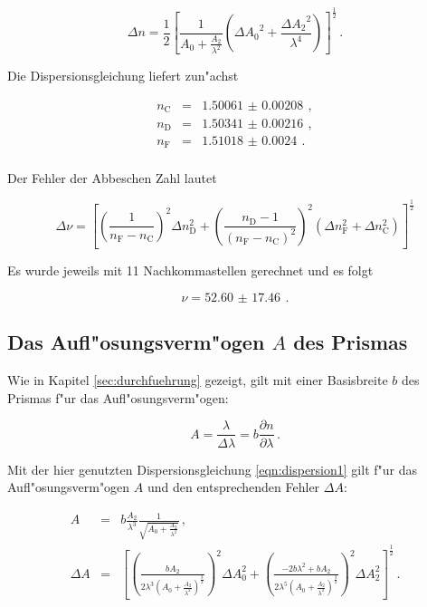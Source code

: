 		\begin{equation*}
			\Delta n = \frac{1}{2}\left[\frac{1}{A_0 + \frac{A_2}{\lambda^2}}\left(\Delta {A_0}^2 + \frac{\Delta {A_2}^2}{\lambda^4}\right)\right]^\frac{1}{2}\,.
		\end{equation*}

		Die Dispersionsgleichung liefert zun"achst

		\begin{eqnarray*}
			n_\mathrm{C} & = & \SI{1.50061(208)}{} \,, \\
			n_\mathrm{D} & = & \SI{1.50341(216)}{} \,, \\
			n_\mathrm{F} & = & \SI{1.51018(240)}{} \,. \\
		\end{eqnarray*}

		Der Fehler der Abbeschen Zahl lautet

		\begin{equation*}
			\Delta \nu = \left[\left(\frac{1}{n_\mathrm{F}-n_\mathrm{C}}\right)^2 \Delta n_\mathrm{D}^2 + \left(\frac{n_\mathrm{D}-1}{(n_\mathrm{F}-n_\mathrm{C})^2}\right)^2\left(\Delta n_\mathrm{F}^2 + \Delta n_\mathrm{C}^2\right) \right]^\frac{1}{2}
		\end{equation*}

		Es wurde jeweils mit 11 Nachkommastellen gerechnet und es folgt

		\begin{equation*}
			\nu = \SI{52.60(1746)}{} \,.
		\end{equation*}

	\subsection{Das Aufl"osungsverm"ogen $A$ des Prismas}
	\label{subsec:aufloesungsvermoegen}
		Wie in Kapitel \ref{sec:durchfuehrung} gezeigt, gilt mit einer Basisbreite $b$ des Prismas f"ur das Aufl"osungsverm"ogen:

		\begin{equation*}
			A = \frac{\lambda}{\Delta \lambda} = b \frac{\partial n}{\partial \lambda} \,.
		\end{equation*}

		Mit der hier genutzten Dispersionsgleichung \eqref{eqn:dispersion1} gilt f"ur das Aufl"osungsverm"ogen $A$ und den entsprechenden Fehler $\Delta A$:

		\begin{eqnarray*}
			A & = & b \frac{A_2}{\lambda^3} \frac{1}{\sqrt{A_0 + \frac{A_2}{\lambda^2}}} \,, \\
			\Delta A & = & \left[\left(\frac{b A_2}{2 \lambda^3 \left( A_0 + \frac{A_2}{\lambda^2} \right)^\frac{3}{2}} \right)^2 \Delta A_0^2 + \left(\frac{-2 b \lambda^2 + b A_2}{2 \lambda^5 \left(A_0 + \frac{A_2}{\lambda^2}\right)^\frac{3}{2}}\right)^2\Delta A_2^2\right]^\frac{1}{2} \,.
		\end{eqnarray*}


